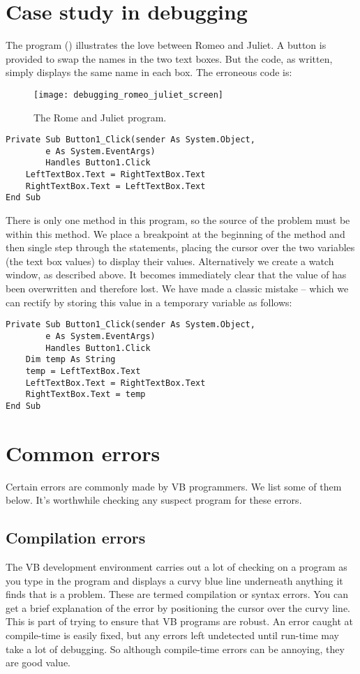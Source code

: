 	\section{Case study in debugging}
	The program () illustrates the love between Romeo and Juliet. A button is provided to swap the names in the two text boxes. But the code, as written, simply displays the same name in each box. The erroneous code is:
			\begin{figure}[bth]
				\centering
				\texttt{[image: debugging\_romeo\_juliet\_screen]}
				\caption{The Rome and Juliet program.}
				\label{fig:debugging_romeo_juliet_screen}
			\end{figure}
		\begin{lstlisting}
Private Sub Button1_Click(sender As System.Object,
		e As System.EventArgs)
		Handles Button1.Click
	LeftTextBox.Text = RightTextBox.Text
	RightTextBox.Text = LeftTextBox.Text
End Sub
		\end{lstlisting}
		There is only one method in this program, so the source of the problem must be within this method. We place a breakpoint at the beginning of the method and then single step through the statements, placing the cursor over the two variables (the text box values) to display their values. Alternatively we create a watch window, as described above. It becomes immediately clear that the value of  has been overwritten and therefore lost. We have made a classic mistake – which we can rectify by storing this value in a temporary variable as follows:
		\begin{lstlisting}
Private Sub Button1_Click(sender As System.Object,
		e As System.EventArgs)
		Handles Button1.Click
	Dim temp As String
	temp = LeftTextBox.Text
	LeftTextBox.Text = RightTextBox.Text
	RightTextBox.Text = temp
End Sub
		\end{lstlisting}


	\section{Common errors}
		Certain errors are commonly made by VB programmers. We list some of them below. It’s worthwhile checking any suspect program for these errors.


		\subsection*{Compilation errors}
			The VB development environment carries out a lot of checking on a program as you type in the program and displays a curvy blue line underneath anything it finds that is a problem. These are termed compilation or syntax errors. You can get a brief explanation of the error by positioning the cursor over the curvy line. This is part of trying to ensure that VB programs are robust. An error caught at compile-time is easily fixed, but any errors left undetected until run-time may take a lot of debugging. So although compile-time errors can be annoying, they are good value.

